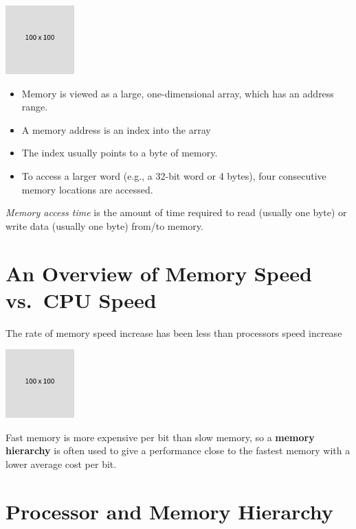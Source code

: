 \documentclass[
  14pt,
  a4paper,
  DIV=11,
  numbers=noendperiod,
  headinclude=true,
  footinclude=true]{scrreprt}
\begin{document}
\includegraphics{index_files/mediabag/FiKGhYhhIWJYiBgWIoaF.png}

\begin{itemize}
\item
  Memory is viewed as a large, one-dimensional array, which has an
  address range.
\item
  A memory address is an index into the array
\item
  The index usually points to a byte of memory.
\item
  To access a larger word (e.g., a 32-bit word or 4 bytes), four
  consecutive memory locations are accessed.
\end{itemize}

\emph{Memory access time} is the amount of time required to read
(usually one byte) or write data (usually one byte) from/to memory.

\section{An Overview of Memory Speed vs.~CPU
Speed}\label{an-overview-of-memory-speed-vs.-cpu-speed}

The rate of memory speed increase has been less than processors speed
increase

\includegraphics{index_files/mediabag/FiKGhYhhIWJYiBgWIoaF.png}

Fast memory is more expensive per bit than slow memory, so a
\textbf{memory hierarchy} is often used to give a performance close to
the fastest memory with a lower average cost per bit.

\section{Processor and Memory
Hierarchy}\label{processor-and-memory-hierarchy}
\end{document}
